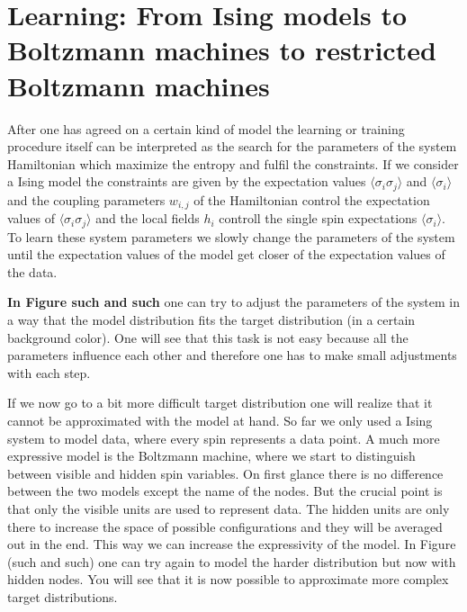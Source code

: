 \documentclass[nofootinbib, superscriptaddress, prl]{revtex4}
\begin{document}
\section{Learning: From Ising models to Boltzmann machines to restricted Boltzmann machines}

\noindent{}


After one has agreed on a certain kind of model the learning or training procedure itself can be interpreted as the search for the parameters of the system Hamiltonian which maximize the entropy and fulfil the constraints. If we consider a Ising model the constraints are given by the expectation values $\langle \sigma_i \sigma_j \rangle $
 and $\langle \sigma_i \rangle$ and the coupling parameters $w_{i,j}$ of the Hamiltonian control the expectation values of $\langle \sigma_i \sigma_j \rangle $ and the local fields $h_i$ controll the single spin expectations $\langle \sigma_i \rangle$.
To learn these system parameters we slowly change the parameters of the system until the expectation values of the model get closer of the expectation values of the data. 

\textbf{In Figure such and such } one can try to adjust the parameters of the system in a way that the model distribution fits the target distribution (in a certain background color). One will see that this task is not easy because all the parameters influence each other and therefore one has to make small adjustments with each step.

If we now go to a bit more difficult target distribution one will realize that it cannot be approximated with the model at hand. So far we only used a Ising system to model data, where every spin represents a data point. A much more expressive model is the Boltzmann machine, where we start to distinguish between visible and hidden spin variables. On first glance there is no difference between the two models except the name of the nodes. But the crucial point is that only the visible units are used to represent data. The hidden units are only there to increase the space of possible configurations and they will be averaged out in the end. This way we can increase the expressivity of the model. In Figure (such and such) one can try again to model the harder distribution but now with hidden nodes. You will see that it is now possible to approximate more complex target distributions.
\end{document}
